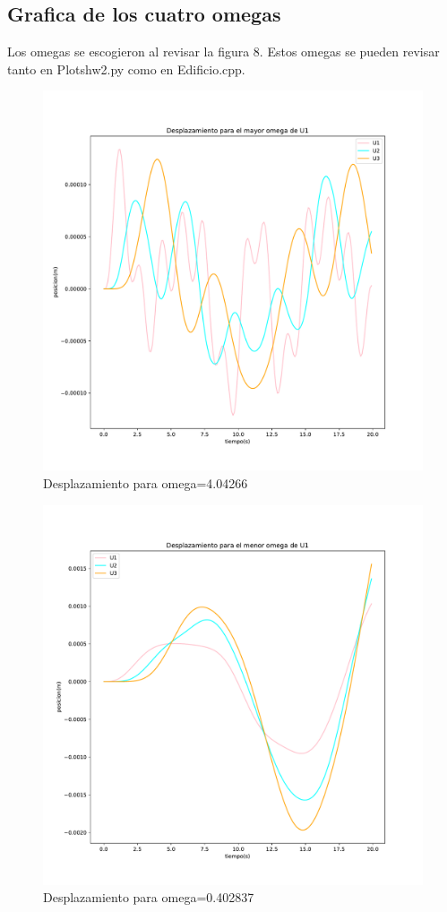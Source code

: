 \documentclass[11pt,letterpaper]{exam}
\begin{document}
\subsection{Grafica de los cuatro omegas}
Los omegas se escogieron al revisar la figura 8.
Estos omegas se pueden revisar tanto en Plotshw2.py como en Edificio.cpp. 
\begin{figure}[H]
    \centering
    \includegraphics[width=1.1\textwidth]{plot_omega1.pdf}
    \caption{ Desplazamiento para omega=4.04266}
    \label{fig:my_label}
\end{figure}

\begin{figure}[H]
    \centering
    \includegraphics[width=1.1\textwidth]{plot_omega2.pdf}
    \caption{ Desplazamiento para omega=0.402837}
    \label{fig:my_label}
\end{figure}
\end{document}
